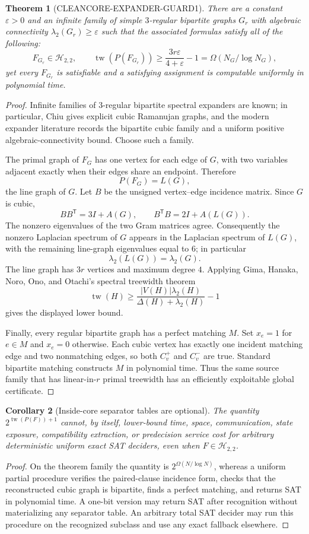 \documentclass[11pt]{article}
\newtheorem{theorem}{Theorem}
\newtheorem{corollary}[theorem]{Corollary}
\newcommand{\tw}{\operatorname{tw}}
\begin{document}
\begin{theorem}[CLEANCORE-EXPANDER-GUARD1]
There are a constant $\varepsilon>0$ and an infinite family of simple
$3$-regular bipartite graphs $G_r$ with algebraic connectivity
$\lambda_2(G_r)\ge\varepsilon$ such that the associated formulas satisfy
all of the following:
\[
 F_{G_r}\in\mathcal H_{2,2},\qquad
 \tw(P(F_{G_r}))\ge
 \frac{3r\varepsilon}{4+\varepsilon}-1
 =\Omega(N_G/\log N_G),
\]
yet every $F_{G_r}$ is satisfiable and a satisfying assignment is computable
uniformly in polynomial time.
\end{theorem}
\begin{proof}
Infinite families of $3$-regular bipartite spectral expanders are known; in
particular, Chiu gives explicit cubic Ramanujan graphs, and the modern
expander literature records the bipartite cubic family and a uniform
positive algebraic-connectivity bound.  Choose such a family.

The primal graph of $F_G$ has one vertex for each edge of $G$, with two
variables adjacent exactly when their edges share an endpoint.  Therefore
\[
 P(F_G)=L(G),
\]
the line graph of $G$.  Let $B$ be the unsigned vertex--edge incidence
matrix.  Since $G$ is cubic,
\[
 BB^{\mathsf T}=3I+A(G),\qquad
 B^{\mathsf T}B=2I+A(L(G)).
\]
The nonzero eigenvalues of the two Gram matrices agree.  Consequently the
nonzero Laplacian spectrum of $G$ appears in the Laplacian spectrum of
$L(G)$, with the remaining line-graph eigenvalues equal to $6$; in
particular
\[
 \lambda_2(L(G))=\lambda_2(G).
\]
The line graph has $3r$ vertices and maximum degree $4$.  Applying Gima,
Hanaka, Noro, Ono, and Otachi's spectral treewidth theorem
\[
 \tw(H)\ge \frac{|V(H)|\lambda_2(H)}{\Delta(H)+\lambda_2(H)}-1
\]
gives the displayed lower bound.

Finally, every regular bipartite graph has a perfect matching $M$.  Set
$x_e=1$ for $e\in M$ and $x_e=0$ otherwise.  Each cubic vertex has exactly
one incident matching edge and two nonmatching edges, so both $C_v^+$ and
$C_v^-$ are true.  Standard bipartite matching constructs $M$ in polynomial
time.  Thus the same source family that has linear-in-$r$ primal treewidth
has an efficiently exploitable global certificate.
\end{proof}

\begin{corollary}[Inside-core separator tables are optional]
The quantity $2^{\tw(P(F))+1}$ cannot, by itself, lower-bound time, space,
communication, state exposure, compatibility extraction, or predecision
service cost for arbitrary deterministic uniform exact SAT deciders, even
when $F\in\mathcal H_{2,2}$.
\end{corollary}
\begin{proof}
On the theorem family the quantity is
$2^{\Omega(N/\log N)}$, whereas a uniform partial procedure verifies the
paired-clause incidence form, checks that the reconstructed cubic graph is
bipartite, finds a perfect matching, and returns SAT in polynomial time.  A
one-bit version may return SAT after recognition without materializing any
separator table.  An arbitrary total SAT decider may run this procedure on
the recognized subclass and use any exact fallback elsewhere.
\end{proof}
\end{document}
